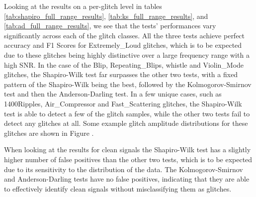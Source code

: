 \documentclass[12pt]{article}
\begin{document}
\noindent Looking at the results on a per-glitch level in tables \ref{tab:shapiro_full_range_results}, \ref{tab:ks_full_range_results}, and \ref{tab:ad_full_range_results}, we see that the tests' performances vary significantly across each of the glitch classes. All the three tests achieve perfect accuracy and F1 Scores for Extremely\_Loud glitches, which is to be expected due to these glitches being highly distinctive over a large frequency range with a high SNR. In the case of the Blip, Repeating\_Blips, whistle and Violin\_Mode glitches, the Shapiro-Wilk test far surpasses the other two tests, with a fixed pattern of the Shapiro-Wilk being the best, followed by the Kolmogorov-Smirnov test and then the Anderson-Darling test. In a few unique cases, such as 1400Ripples, Air\_Compressor and Fast\_Scattering glitches, the Shapiro-Wilk test is able to detect a few of the glitch samples, while the other two tests fail to detect any glitches at all. Some example glitch amplitude distributions for these glitches are shown in Figure .

\medskip
\noindent When looking at the results for clean signals the Shapiro-Wilk test has a slightly higher number of false positives than the other two tests, which is to be expected due to its sensitivity to the distribution of the data. The Kolmogorov-Smirnov and Anderson-Darling tests have no false positives, indicating that they are able to effectively identify clean signals without misclassifying them as glitches.

\end{document}
